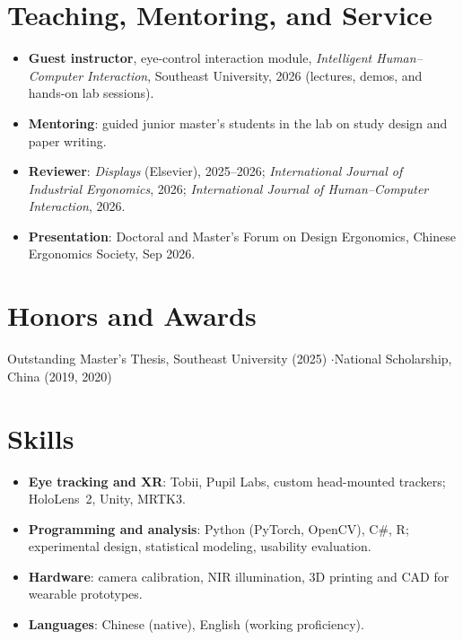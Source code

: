\documentclass[10pt,a4paper]{article}
\begin{document}
\section{Teaching, Mentoring, and Service}
\begin{itemize}
  \item \textbf{Guest instructor}, eye-control interaction module, \textit{Intelligent Human--Computer Interaction}, Southeast University, 2026 (lectures, demos, and hands-on lab sessions).
  \item \textbf{Mentoring}: guided junior master's students in the lab on study design and paper writing.
  \item \textbf{Reviewer}: \textit{Displays} (Elsevier), 2025--2026; \textit{International Journal of Industrial Ergonomics}, 2026; \textit{International Journal of Human--Computer Interaction}, 2026.
  \item \textbf{Presentation}: Doctoral and Master's Forum on Design Ergonomics, Chinese Ergonomics Society, Sep 2026.
\end{itemize}

\section{Honors and Awards}
Outstanding Master's Thesis, Southeast University (2025) \quad$\cdot$\quad National Scholarship, China (2019, 2020)

\section{Skills}
\begin{itemize}
  \item \textbf{Eye tracking and XR}: Tobii, Pupil Labs, custom head-mounted trackers; HoloLens~2, Unity, MRTK3.
  \item \textbf{Programming and analysis}: Python (PyTorch, OpenCV), C\#, R; experimental design, statistical modeling, usability evaluation.
  \item \textbf{Hardware}: camera calibration, NIR illumination, 3D printing and CAD for wearable prototypes.
  \item \textbf{Languages}: Chinese (native), English (working proficiency).
\end{itemize}
\end{document}
